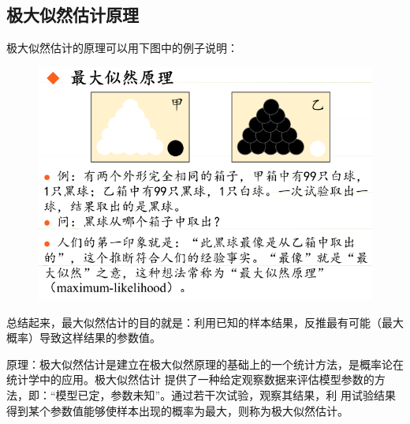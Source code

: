 \documentclass[UTF8]{ctexart}
\begin{document}
{\subsection{极大似然估计原理}
极大似然估计的原理可以用下图中的例子说明：
\begin{figure}[ht]
    \centering
    \includegraphics[scale=0.8]{03.jpg}
\end{figure}\par
总结起来，最大似然估计的目的就是：利用已知的样本结果，反推最有可能（最大概率）导致这样结果的参数值。\par
原理：极大似然估计是建立在极大似然原理的基础上的一个统计方法，是概率论在统计学中的应用。极大似然估计
提供了一种给定观察数据来评估模型参数的方法，即：“模型已定，参数未知”。通过若干次试验，观察其结果，利
用试验结果得到某个参数值能够使样本出现的概率为最大，则称为极大似然估计。\par
}
\end{document}
